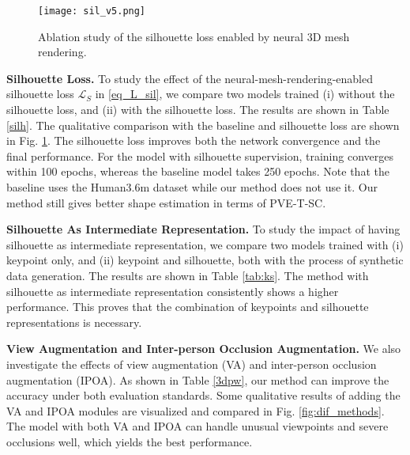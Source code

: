 \documentclass[journal]{IEEEtran}
\begin{document}
\begin{figure}[htbp]
    \centerline{\texttt{[image: sil\_v5.png]}}
\caption{Ablation study of the silhouette loss enabled by neural 3D mesh rendering.}
    \label{fig:sil}
\end{figure}

\noindent\textbf{Silhouette Loss.} To study the effect of the neural-mesh-rendering-enabled silhouette loss $\mathcal{L}_{S}$ in {\eqref{eq_L_sil}}, we compare two models trained (i) without the silhouette loss, and (ii) with the silhouette loss. The results are shown in Table \ref{silh}. The qualitative comparison with the baseline and silhouette loss are shown in Fig. \ref{fig:sil}. The silhouette loss improves both the network convergence and the final performance. For the model with silhouette supervision, training converges within 100 epochs, whereas the baseline model takes 250 epochs. Note that the baseline uses the Human3.6m dataset while our method does not use it. Our method still gives better shape estimation in terms of PVE-T-SC.

\noindent\textbf{Silhouette As Intermediate Representation.} To study the impact of having silhouette as intermediate representation, we compare two models trained with (i) keypoint only, and (ii) keypoint and silhouette, both with the process of synthetic data generation. The results are shown in Table \ref{tab:ks}. The method with silhouette as intermediate representation consistently shows a higher performance. This proves that the combination of keypoints and silhouette representations is necessary.

\noindent\textbf{View Augmentation and Inter-person Occlusion Augmentation.} We also investigate the effects of view augmentation (VA) and inter-person occlusion augmentation (IPOA). As shown in Table \ref{3dpw}, our method can improve the accuracy under both evaluation standards. Some qualitative results of adding the VA and IPOA modules are visualized and compared in Fig. \ref{fig:dif_methods}. The model with both VA and IPOA can handle unusual viewpoints and severe occlusions well, which yields the best performance.
\end{document}
